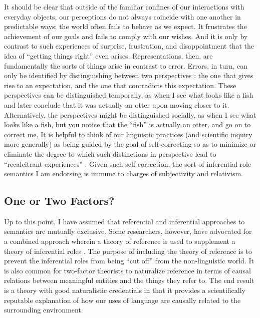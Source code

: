 It should be clear that outside of the familiar confines of our interactions with everyday objects, our perceptions do not always coincide with one another in predictable ways; the world often fails to behave as we expect. It frustrates the achievement of our goals and fails to comply with our wishes. And it is only by contrast to such experiences of surprise, frustration, and disappointment that the idea of ``getting things right'' even arises. Representations, then, are fundamentally the sorts of things arise in contrast to error. Errors, in turn, can only be identified by distinguishing between two perspectives \citep[see][]{Brandom:1994}: the one that gives rise to an expectation, and the one that contradicts this expectation. These perspectives can be distinguished temporally, as when I see what looks like a fish and later conclude that it was actually an otter upon moving closer to it. Alternatively, the perspectives might be distinguished socially, as when I see what looks like a fish, but you notice that the ``fish'' is actually an otter, and go on to correct me. It is helpful to think of our linguistic practices (and scientific inquiry more generally) as being guided by the goal of self-correcting so as to minimize or eliminate the degree to which such distinctions in perspective lead to ``recalcitrant experiences'' \citep{Misak:2013}. Given such self-correction, the sort of inferential role semantics I am endorsing is immune to charges of subjectivity and relativism. 

\subsection{One or Two Factors?}

Up to this point, I have assumed that referential and inferential approaches to semantics are mutually exclusive. Some researchers, however, have advocated for a combined approach wherein a theory of reference is used to supplement a theory of inferential roles \citep[e.g.,][]{Eliasmith:2000,Block:1986}. The purpose of including the theory of reference is to prevent the inferential roles from being ``cut off'' from the non-linguistic world. It is also common for two-factor theorists to naturalize reference in terms of causal relations between meaningful entities and the things they refer to. The end result is a theory with good naturalistic credentials in that it provides a scientifically reputable explanation of how our uses of language are causally related to the surrounding environment.  

